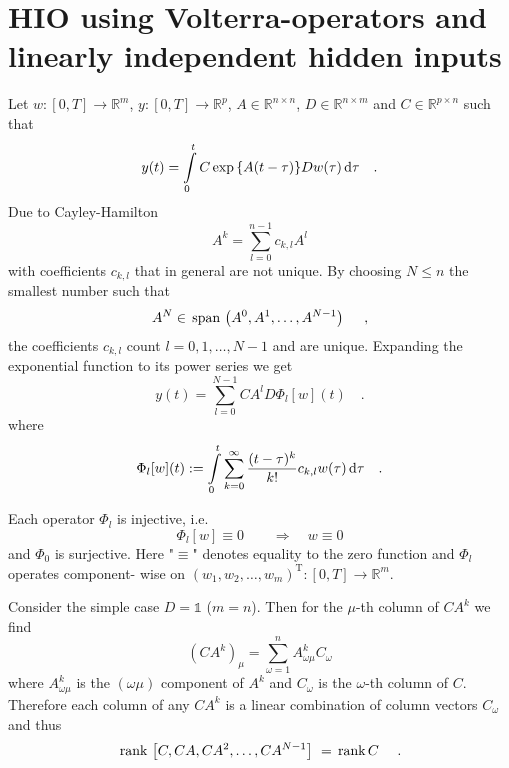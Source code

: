 \section{HIO using Volterra-operators and linearly independent hidden inputs }
Let $w:[0,T]\rightarrow \mathbb{R}^m$, $y:[0,T]\rightarrow \mathbb{R}^p$, 
$A\in \mathbb{R}^{n\times n}$, $D\in\mathbb{R}^{n\times m}$ and $C\in\mathbb{R}^{p\times 
n}
$ such that 
\begin{equation}
y(t) = \int\limits_0^t C \exp{\left\{A(t-\tau)\right\}} D w(\tau) \, \text{d} \tau \quad .
\label{eq:volterra:y}
\end{equation}
Due to Cayley-Hamilton
\begin{equation}
A^k = \sum\limits_{l=0}^{n-1} c_{k,l} A^l 
\end{equation}
with coefficients $c_{k,l}$ that in general are not unique. By choosing $N\leq n$ the 
smallest number such that
\begin{equation}
A^N \in  \, \text{span}\,\left(A^0,A^1,\ldots,A^{N-1} \right) \,\, \quad ,
\end{equation}
the coefficients $c_{k,l}$ count $l=0,1,\ldots,N-1$ and are unique. 
Expanding the exponential function to its power series we get
\begin{equation}
y(t) = \sum\limits_{l=0}^{N-1} CA^lD \Phi_l[w](t)
\quad . \label{eq:volterra_alt1:y_volterra}
\end{equation}
where
\begin{equation}
\Phi_l[w](t) :=  \int\limits_0^t \sum\limits_{k=0}^\infty \frac{(t-\tau)^k}{k!} c_{k,l} 
w(\tau) \, \text{d}\tau \quad .
\label{eq:volterra_alt1:Phi_l}
\end{equation}
\begin{proposition} \label{prop:volterra_alt1:1}
Each operator $\Phi_l$ is injective, i.e. 
\begin{equation}
\Phi_l[w] \equiv 0\quad \quad \Rightarrow  \quad w \equiv 0  
\end{equation}
and $\Phi_0$ is surjective.
Here "$\equiv$" denotes equality to the zero function and $\Phi_l$ operates component-
wise on $(w_1,w_2,\ldots,w_m)^\text{T}:[0,T]\rightarrow \mathbb{R}^m$.
\end{proposition}

Consider the simple case $D=\mathbb{1}$ ($m=n$). Then for the $\mu$-th column of $CA^k$ 
we find
\begin{equation}
\left(CA^k \right)_\mu = \sum\limits_{\omega = 1}^n A^k_{\omega\mu} C_\omega
\end{equation}
where $A^k_{\omega\mu}$ is the $(\omega\mu)$ component of $A^k$ and $C_\omega$ is the 
$\omega$-th column of $C$.
Therefore each column of any $CA^k$ is a linear combination of column vectors 
$C_\omega$ and thus 
\begin{equation}
 \, \text{rank}\,\left[C,CA,CA^2,\ldots,CA^{N-1}\right] \,\,  =  \, \text{rank}\,C \,\,  \quad .
\end{equation}


